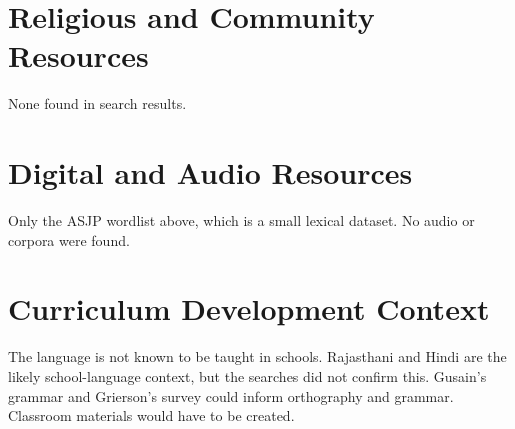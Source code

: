 \documentclass[12pt]{article}
\begin{document}
\section{Religious and Community Resources}
None found in search results.

\section{Digital and Audio Resources}
Only the ASJP wordlist above, which is a small lexical dataset. No audio or corpora were found.

\section{Curriculum Development Context}
The language is not known to be taught in schools. Rajasthani and Hindi are the likely school-language context, but the searches did not confirm this. Gusain's grammar and Grierson's survey could inform orthography and grammar. Classroom materials would have to be created.
\end{document}
